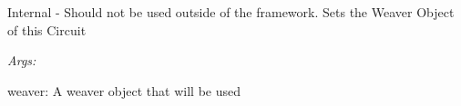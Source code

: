 \documentclass[letterpaper,10pt,english]{sphinxmanual}
\begin{document}
\begin{fulllineitems}
\begin{fulllineitems}
\end{fulllineitems}


\begin{fulllineitems}
\label{modules/index:aosb.core.Aspect.setWeaver}
Internal - Should not be used outside of the framework.
Sets the Weaver Object of this Circuit

\begin{DUlineblock}{0em}
\item[] \emph{Args:}
\item[]
\begin{DUlineblock}{\DUlineblockindent}
\item[] weaver: A weaver object that will be used
\end{DUlineblock}
\end{DUlineblock}

\end{fulllineitems}


\end{fulllineitems}

\end{document}

